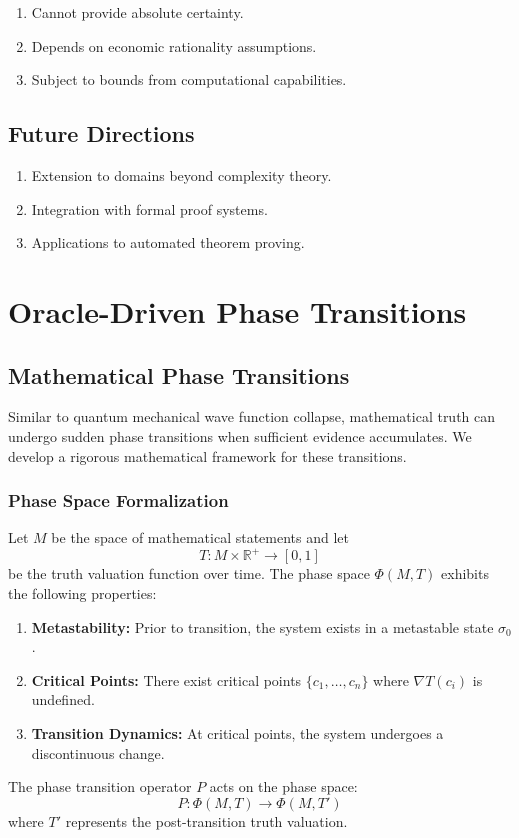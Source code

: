 \documentclass[11pt]{article}
\begin{document}
\begin{enumerate}[label=(\arabic*)]
    \item Cannot provide absolute certainty.
    \item Depends on economic rationality assumptions.
    \item Subject to bounds from computational capabilities.
\end{enumerate}

\subsection{Future Directions}

\begin{enumerate}[label=(\arabic*)]
    \item Extension to domains beyond complexity theory.
    \item Integration with formal proof systems.
    \item Applications to automated theorem proving.
\end{enumerate}

\section{Oracle-Driven Phase Transitions}

\subsection{Mathematical Phase Transitions}

Similar to quantum mechanical wave function collapse, mathematical truth can undergo sudden phase transitions when sufficient evidence accumulates. We develop a rigorous mathematical framework for these transitions.

\subsubsection{Phase Space Formalization}

Let $M$ be the space of mathematical statements and let
\[
T: M \times \mathbb{R}^{+} \to [0,1]
\]
be the truth valuation function over time. The phase space $\Phi(M,T)$ exhibits the following properties:
\begin{enumerate}[label=(\arabic*)]
    \item \textbf{Metastability:} Prior to transition, the system exists in a metastable state $\sigma_0$.
    \item \textbf{Critical Points:} There exist critical points $\{c_1, \dots, c_n\}$ where $\nabla T(c_i)$ is undefined.
    \item \textbf{Transition Dynamics:} At critical points, the system undergoes a discontinuous change.
\end{enumerate}
The phase transition operator $P$ acts on the phase space:
\[
P: \Phi(M,T) \to \Phi(M,T')
\]
where $T'$ represents the post-transition truth valuation.
\end{document}
